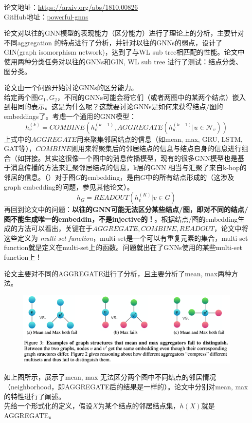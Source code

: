 
论文地址：\href{https://arxiv.org/abs/1810.00826}{https://arxiv.org/abs/1810.00826}\\
GitHub地址：\href{https://github.com/weihua916/powerful-gnns}{powerful-gnns}

论文\cite{xu2018how}对以往的GNN模型的表现能力（区分能力）进行了理论上的分析，主要针对不同aggregation 的特点进行了分析，并针对以往的GNNs的弱点，设计了GIN(graph isomorphism network)，达到了与WL sub tree相匹配的性能。论文中使用两种分类任务对以往的GNNs和GIN, WL sub tree 进行了测试：结点分类、图分类。

论文由一个问题开始讨论GNNs的区分能力。\\
给定两个图$G_1, G_2$，不同的GNNs可能会将它们（或者两图中的某两个结点）嵌入到相同的表示。这是为什么呢？这就要讨论GNNs是如何来获得结点/图的embeddings了。考虑一个通用的GNN模型：
$$
h_v^{(k)} = COMBINE(h_v^{(k-1)},  AGGREGATE({h_u^{(k-1)} | u \in \mathcal{N}_v } ) )
$$
上式中的$AGGREGATE$用来聚集邻居结点的信息（如mean, max, GRU, LSTM, GAT等），$COMBINE$则用来将聚集后的邻居结点的信息与结点自身的信息进行组合（如拼接。其实这很像一个图中的消息传播模型，现有的很多GNN模型也是基于消息传播的方法来汇聚邻居结点的信息，k层的GNN 相当与汇聚了来自k-hop的邻居的信息。（{\color{red}{能否使用其他的框架来构建GNN模型呢？}}）对于图$G$的embedding，是由$G$中的所有结点形成的（这涉及graph embedding的问题，参见其他论文）。
$$
h_G = READOUT(h_v^{(K)} | v \in G)
$$
再回到论文中的问题：\textbf{以往的GNN可能无法区分某些结点/图，即对不同的结点/图不能生成唯一的embeddin，不是injective的！}。根据结点/图的embedding生成的方法可以看出，关键在于$AGGREGATE, COMBINE, READOUT$，论文中将这些定义为 \textit{multi-set function}，multi-set是一个可以有重复元素的集合，multi-set function就是定义在multi-set上的函数。问题就出在了GNNs使用的某些multi-set function上！
\par 论文主要对不同的AGGREGATE进行了分析，且主要分析了mean, max两种方法。
\begin{figure}
    \centering
    \includegraphics[width=1.\textwidth]{pics/mean-max.png}
\end{figure}
如上图所示，展示了mean, max 无法区分两个图中不同结点的邻居情况（neighborhood，即AGGREGATE后的结果是一样的）。论文中分别对mean, max的特性进行了阐述。\\
先给一个形式化的定义，假设$X$为某个结点的邻居结点集，$h(X)$就是AGGREGATE。
